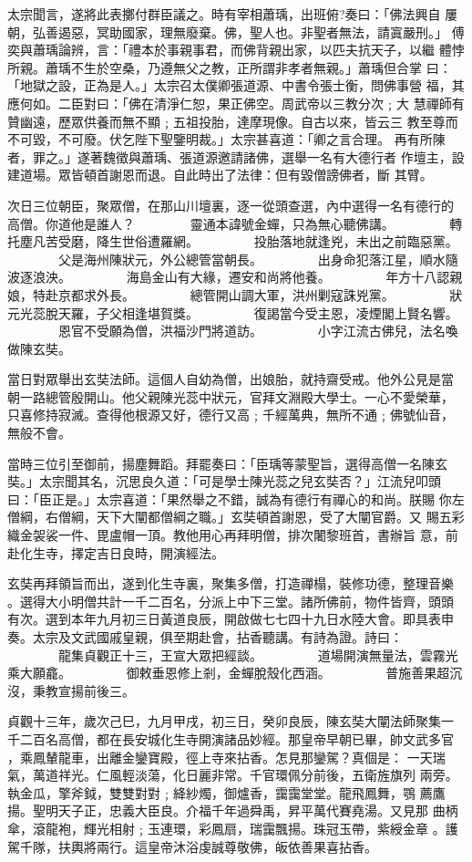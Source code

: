 \begin{pinyinscope}
{太宗聞言，遂將此表擲付群臣議之。時有宰相蕭瑀，出班俯?奏曰：「佛法興自
屢朝，弘善遏惡，冥助國家，理無廢棄。佛，聖人也。非聖者無法，請寘嚴刑。」
傅奕與蕭瑀論辨，言：「禮本於事親事君，而佛背親出家，以匹夫抗天子，以繼
體悖所親。蕭瑀不生於空桑，乃遵無父之教，正所謂非孝者無親。」蕭瑀但合掌
曰：「地獄之設，正為是人。」太宗召太僕卿張道源、中書令張士衡，問佛事營
福，其應何如。二臣對曰：「佛在清淨仁恕，果正佛空。周武帝以三教分次﹔大
慧禪師有贊幽遠，歷眾供養而無不顯﹔五祖投胎，達摩現像。自古以來，皆云三
教至尊而不可毀，不可廢。伏乞陛下聖鑒明裁。」太宗甚喜道：「卿之言合理。
再有所陳者，罪之。」遂著魏徵與蕭瑀、張道源邀請諸佛，選舉一名有大德行者
作壇主，設建道場。眾皆頓首謝恩而退。自此時出了法律：但有毀僧謗佛者，斷
其臂。

次日三位朝臣，聚眾僧，在那山川壇裏，逐一從頭查選，內中選得一名有德行的
高僧。你道他是誰人？
　　　　靈通本諱號金蟬，只為無心聽佛講。
　　　　轉托塵凡苦受磨，降生世俗遭羅網。
　　　　投胎落地就逢兇，未出之前臨惡黨。
　　　　父是海州陳狀元，外公總管當朝長。
　　　　出身命犯落江星，順水隨波逐浪泱。
　　　　海島金山有大緣，遷安和尚將他養。
　　　　年方十八認親娘，特赴京都求外長。
　　　　總管開山調大軍，洪州剿寇誅兇黨。
　　　　狀元光蕊脫天羅，子父相逢堪賀獎。
　　　　復謁當今受主恩，凌煙閣上賢名響。
　　　　恩官不受願為僧，洪福沙門將道訪。
　　　　小字江流古佛兒，法名喚做陳玄奘。

當日對眾舉出玄奘法師。這個人自幼為僧，出娘胎，就持齋受戒。他外公見是當
朝一路總管殷開山。他父親陳光蕊中狀元，官拜文淵殿大學士。一心不愛榮華，
只喜修持寂滅。查得他根源又好，德行又高﹔千經萬典，無所不通﹔佛號仙音，
無般不會。

當時三位引至御前，揚塵舞蹈。拜罷奏曰：「臣瑀等蒙聖旨，選得高僧一名陳玄
奘。」太宗聞其名，沉思良久道：「可是學士陳光蕊之兒玄奘否？」江流兒叩頭
曰：「臣正是。」太宗喜道：「果然舉之不錯，誠為有德行有禪心的和尚。朕賜
你左僧綱，右僧綱，天下大闡都僧綱之職。」玄奘頓首謝恩，受了大闡官爵。又
賜五彩織金袈裟一件、毘盧帽一頂。教他用心再拜明僧，排次闍黎班首，書辦旨
意，前赴化生寺，擇定吉日良時，開演經法。

玄奘再拜領旨而出，遂到化生寺裏，聚集多僧，打造禪榻，裝修功德，整理音樂
。選得大小明僧共計一千二百名，分派上中下三堂。諸所佛前，物件皆齊，頭頭
有次。選到本年九月初三日黃道良辰，開啟做七七四十九日水陸大會。即具表申
奏。太宗及文武國戚皇親，俱至期赴會，拈香聽講。有詩為證。詩曰：
　　　　龍集貞觀正十三，王宣大眾把經談。
　　　　道場開演無量法，雲霧光乘大願龕。
　　　　御敕垂恩修上剎，金蟬脫殼化西涵。
　　　　普施善果超沉沒，秉教宣揚前後三。

貞觀十三年，歲次己巳，九月甲戌，初三日，癸卯良辰，陳玄奘大闡法師聚集一
千二百名高僧，都在長安城化生寺開演諸品妙經。那皇帝早朝已畢，帥文武多官
，乘鳳輦龍車，出離金鑾寶殿，徑上寺來拈香。怎見那鑾駕？真個是：
一天瑞氣，萬道祥光。仁風輕淡蕩，化日麗非常。千官環佩分前後，五衛旌旗列
兩旁。執金瓜，擎斧鉞，雙雙對對﹔絳紗燭，御爐香，靄靄堂堂。龍飛鳳舞，鶚
薦鷹揚。聖明天子正，忠義大臣良。介福千年過舜禹，昇平萬代賽堯湯。又見那
曲柄傘，滾龍袍，輝光相射﹔玉連環，彩鳳扇，瑞靄飄揚。珠冠玉帶，紫綬金章
。護駕千隊，扶輿將兩行。這皇帝沐浴虔誠尊敬佛，皈依善果喜拈香。

}
\end{pinyinscope}
